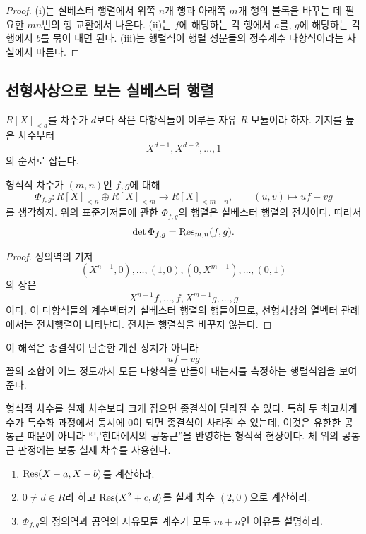\begin{proof}
(i)는 실베스터 행렬에서 위쪽 $n$개 행과 아래쪽 $m$개 행의 블록을 바꾸는 데 필요한 $mn$번의 행 교환에서 나온다. (ii)는 $f$에 해당하는 각 행에서 $a$를, $g$에 해당하는 각 행에서 $b$를 묶어 내면 된다. (iii)는 행렬식이 행렬 성분들의 정수계수 다항식이라는 사실에서 따른다.
\end{proof}

\subsection{선형사상으로 보는 실베스터 행렬}

$R[X]_{<d}$를 차수가 $d$보다 작은 다항식들이 이루는 자유 $R$-모듈이라 하자. 기저를 높은 차수부터
\[
  X^{d-1},X^{d-2},\dots,1
\]
의 순서로 잡는다.

\begin{proposition}[실베스터 사상]
\label{prop:sylvester-linear-map}
형식적 차수가 $(m,n)$인 $f,g$에 대해
\[
  \Phi_{f,g}:
  R[X]_{<n}\oplus R[X]_{<m}
  \longrightarrow R[X]_{<m+n},
  \qquad
  (u,v)\longmapsto uf+vg
\]
를 생각하자. 위의 표준기저들에 관한 $\Phi_{f,g}$의 행렬은 실베스터 행렬의 전치이다. 따라서
\[
  \det\Phi_{f,g}=\operatorname{Res}_{m,n}(f,g).
\]
\end{proposition}

\begin{proof}
정의역의 기저
\[
  (X^{n-1},0),\dots,(1,0),
  (0,X^{m-1}),\dots,(0,1)
\]
의 상은
\[
  X^{n-1}f,\dots,f,
  X^{m-1}g,\dots,g
\]
이다. 이 다항식들의 계수벡터가 실베스터 행렬의 행들이므로, 선형사상의 열벡터 관례에서는 전치행렬이 나타난다. 전치는 행렬식을 바꾸지 않는다.
\end{proof}

이 해석은 종결식이 단순한 계산 장치가 아니라
\[
  uf+vg
\]
꼴의 조합이 어느 정도까지 모든 다항식을 만들어 내는지를 측정하는 행렬식임을 보여 준다.

\begin{pitfall}
형식적 차수를 실제 차수보다 크게 잡으면 종결식이 달라질 수 있다. 특히 두 최고차계수가 특수화 과정에서 동시에 $0$이 되면 종결식이 사라질 수 있는데, 이것은 유한한 공통근 때문이 아니라 ``무한대에서의 공통근''을 반영하는 형식적 현상이다. 체 위의 공통근 판정에는 보통 실제 차수를 사용한다.
\end{pitfall}

\begin{checkpoint}
\begin{enumerate}[label=(\alph*)]
  \item $\operatorname{Res}(X-a,X-b)$를 계산하라.
  \item $0\ne d\in R$라 하고 $\operatorname{Res}(X^2+c,d)$를 실제 차수 $(2,0)$으로 계산하라.
  \item $\Phi_{f,g}$의 정의역과 공역의 자유모듈 계수가 모두 $m+n$인 이유를 설명하라.
\end{enumerate}
\end{checkpoint}
